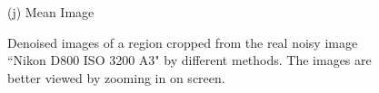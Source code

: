 \documentclass[10pt,onecolumn,letterpaper]{article}
\begin{document}
\begin{figure}[H]
{\begin{minipage}[t]{0.196\textwidth}
{\footnotesize (j) Mean Image \cite{crosschannel2016} }
\end{minipage}
}
\caption{Denoised images of a region cropped from the real noisy image ``Nikon D800 ISO 3200 A3" \cite{crosschannel2016} by different methods. The images are better viewed by zooming in on screen.} 
\label{fig18}
\end{figure}

\begin{figure}[H]\vspace{1mm}
\centering
{}
\end{figure}
\end{document}
